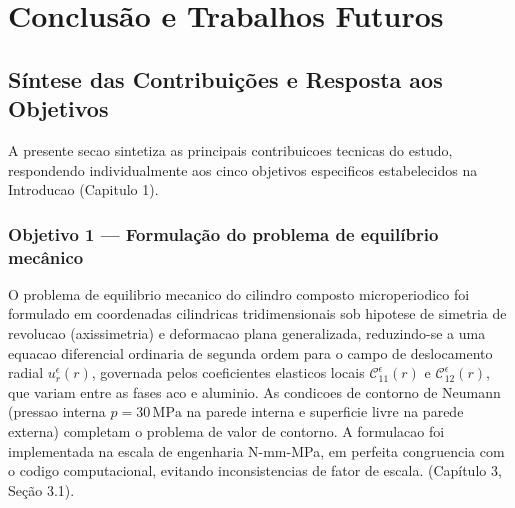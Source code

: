 \chapter{Conclusão e Trabalhos Futuros}\label{cap:conclusao}


\section{Síntese das Contribuições e Resposta aos Objetivos}\label{sec:conclusao_objetivos}

A presente secao sintetiza as principais contribuicoes tecnicas do estudo, respondendo individualmente aos cinco objetivos especificos estabelecidos na Introducao (Capitulo 1).

\subsection{Objetivo 1 — Formulação do problema de equilíbrio mecânico}
O problema de equilibrio mecanico do cilindro composto microperiodico foi formulado em coordenadas cilindricas tridimensionais sob hipotese de simetria de revolucao (axissimetria) e deformacao plana generalizada, reduzindo-se a uma equacao diferencial ordinaria de segunda ordem para o campo de deslocamento radial $u_r^\epsilon(r)$, governada pelos coeficientes elasticos locais $\mathcal{C}_{11}^\epsilon(r)$ e $\mathcal{C}_{12}^\epsilon(r)$, que variam entre as fases aco e aluminio. As condicoes de contorno de Neumann (pressao interna $p = 30\,\text{MPa}$ na parede interna e superficie livre na parede externa) completam o problema de valor de contorno. A formulacao foi implementada na escala de engenharia N-mm-MPa, em perfeita congruencia com o codigo computacional, evitando inconsistencias de fator de escala. (Capítulo 3, Seção 3.1).

